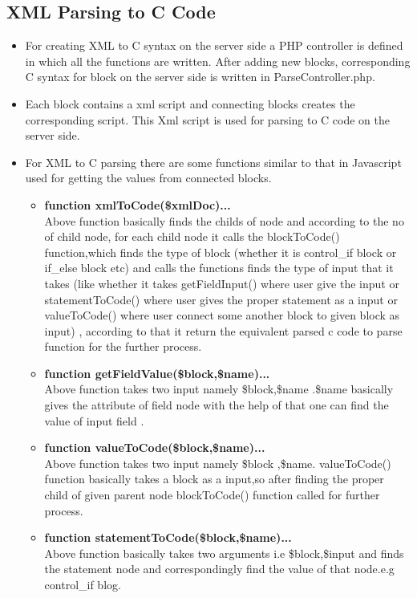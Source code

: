 \documentclass[a4paper,12pt,oneside]{book}
\begin{document}
\subsection{XML Parsing to C Code}
  \begin{itemize}
	\item
	For creating XML to C syntax on the server side a PHP controller is defined in which all the functions are written.
	After adding new blocks, corresponding C syntax for block on the server side is written in ParseController.php. 
	\item
	Each block contains a xml script and connecting blocks creates the corresponding script. This Xml script is used for parsing to C code on the server side.
	\item
	For XML to C parsing there are some functions similar to that in Javascript used for getting the values from connected blocks.
	 \begin{itemize}
	   \item\textbf{function xmlToCode(\$xmlDoc){...}}\\
	   Above function basically finds the childs of node and according to the no of child node, for each child node it calls the blockToCode() function,which finds the type of block (whether it is control\_if block or if\_else block etc) and calls the functions finds the type of input that it takes (like whether it takes getFieldInput() where user give the input or statementToCode() where user gives the proper statement as a input or valueToCode() where user connect some another block to given block as input) , according to that it return the equivalent parsed c code to parse function for the further process.\\
	   \item\textbf{function getFieldValue(\$block,\$name){...}}\\
	   Above function takes two input namely \$block,\$name .\$name basically gives the attribute of field node with the help of that one can find the value of input field .\\
	   \item
	   \textbf{function valueToCode(\$block,\$name){...}}\\
	   Above function takes two input namely \$block ,\$name. valueToCode() function basically takes a block as a input,so after finding the proper child of given parent node blockToCode() function called for further process.\\
	   \item\textbf{function statementToCode(\$block,\$name){...}}\\
	   Above function basically takes two arguments i.e \$block,\$input and finds the statement node and correspondingly find the value of that node.e.g control\_if blog.\\
	 \end{itemize}
  \end{itemize}
\end{document}

